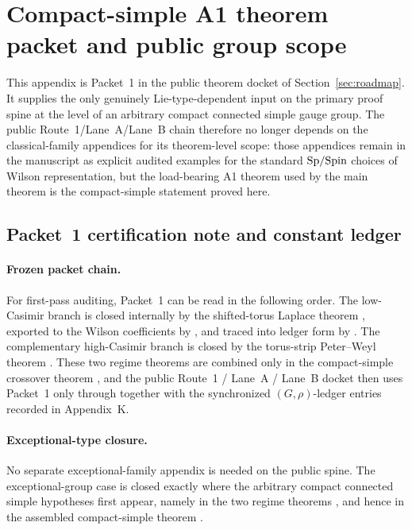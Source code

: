 \section{Compact-simple A1 theorem packet and public group scope}
\label{app:A1_compact_simple}

This appendix is Packet~1 in the public theorem docket of Section~\ref{sec:roadmap}.
It supplies the only genuinely Lie-type-dependent input on the primary proof spine at the level of an arbitrary compact connected simple gauge group.
The public Route~1/Lane~A/Lane~B chain therefore no longer depends on the classical-family appendices for its theorem-level scope: those appendices remain in the manuscript as explicit audited examples for the standard $\mathrm{Sp}/\mathrm{Spin}$ choices of Wilson representation, but the load-bearing A1 theorem used by the main theorem is the compact-simple statement proved here.

\subsection{Packet~1 certification note and constant ledger}
\label{subsec:A1_packet1_certification}

\paragraph{Frozen packet chain.}
For first-pass auditing, Packet~1 can be read in the following order.
The low-Casimir branch is closed internally by the shifted-torus Laplace theorem
, exported to the Wilson coefficients by
, and traced into ledger form by
.
The complementary high-Casimir branch is closed by the torus-strip Peter--Weyl theorem
.
These two regime theorems are combined only in the compact-simple crossover theorem
, and the public Route~1 / Lane~A / Lane~B docket then uses Packet~1 only through
 together with the synchronized $(G,\rho)$-ledger entries recorded in Appendix~K.

\paragraph{Exceptional-type closure.}
No separate exceptional-family appendix is needed on the public spine.
The exceptional-group case is closed exactly where the arbitrary compact connected simple hypotheses first appear, namely in the two regime theorems
, and hence in the assembled compact-simple theorem
.

